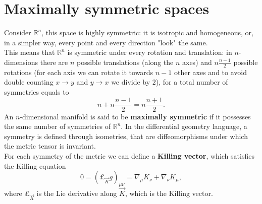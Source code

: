 \appendix
\section{Maximally symmetric spaces}
Consider $\mathbb{R}^n$, this space is highly symmetric: it is isotropic and homogeneous, or, in a simpler way, every point and every direction "look" the same.\\
This means that $\mathbb{R}^n$ is symmetric under every rotation and translation: in $n$-dimensions there are $n$ possible translations (along the $n$ axes) and $n\frac{n-1}{2}$ possible rotations (for each axis we can rotate it towards $n-1$ other axes and to avoid double counting $x\rightarrow y$ and $y\rightarrow x$ we divide by $2$), for a total number of symmetries equals to $$n+n\frac{n-1}{2}=n\frac{n+1}{2}.$$ 
An $n$-dimensional manifold is said to be \textbf{maximally symmetric} if it possesses the same number of symmetries of $\mathbb{R}^n$. In the differential geometry language, a symmetry is defined through isometries, that are diffeomorphisms under which the metric tensor is invariant.\\
For each symmetry of the metric we can define a \textbf{Killing vector}, which satisfies the Killing equation 
\begin{equation}
    0=(\pounds_{\vec K}g)_{\mu\nu}=\nabla_\mu K_\nu+\nabla_\nu K_\mu, \label{KillingEq}
\end{equation}
where $\pounds_{\vec{K}}$ is the Lie derivative along $\vec K$, which is the Killing vector.\\


